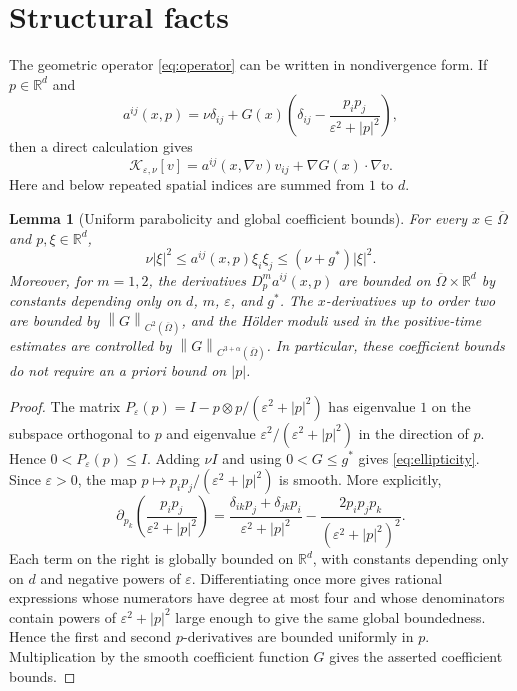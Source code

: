 \documentclass[11pt]{article}
\newtheorem{lemma}[theorem]{Lemma}
\theoremstyle{remark}
\newcommand{\R}{\mathbb{R}}
\newcommand{\eps}{\varepsilon}
\newcommand{\nupar}{\nu}
\newcommand{\norm}[1]{\left\lVert #1\right\rVert}
\newcommand{\cK}{\mathcal{K}}
\begin{document}
\section{Structural facts}
\label{sec:structure}

The geometric operator \eqref{eq:operator} can be written in nondivergence form.  If $p\in\R^d$ and
\begin{equation}\label{eq:aij}
        a^{ij}(x,p)=\nupar\delta_{ij}+G(x)\left(\delta_{ij}-\frac{p_i p_j}{\eps^2+|p|^2}\right),
\end{equation}
then a direct calculation gives
\begin{equation}\label{eq:nondivergence}
        \cK_{\eps,\nupar}[v]
        =a^{ij}(x,\nabla v)v_{ij}+\nabla G(x)\cdot\nabla v.
\end{equation}
Here and below repeated spatial indices are summed from $1$ to $d$.

\begin{lemma}[Uniform parabolicity and global coefficient bounds]\label{lem:ellipticity}
For every $x\in\overline\Omega$ and $p,\xi\in\R^d$,
\begin{equation}\label{eq:ellipticity}
        \nupar |\xi|^2\le a^{ij}(x,p)\xi_i\xi_j\le (\nupar+g^*)|\xi|^2.
\end{equation}
Moreover, for $m=1,2$, the derivatives $D_p^m a^{ij}(x,p)$ are bounded on $\overline\Omega\times\R^d$ by constants depending only on $d$, $m$, $\eps$, and $g^*$.  The $x$-derivatives up to order two are bounded by $\norm{G}_{C^{2}(\overline\Omega)}$, and the H\"older moduli used in the positive-time estimates are controlled by $\norm{G}_{C^{3+\alpha}(\overline\Omega)}$.  In particular, these coefficient bounds do not require an a priori bound on $|p|$.
\end{lemma}

\begin{proof}
The matrix $P_\eps(p)=I-p\otimes p/(\eps^2+|p|^2)$ has eigenvalue $1$ on the subspace orthogonal to $p$ and eigenvalue $\eps^2/(\eps^2+|p|^2)$ in the direction of $p$.  Hence $0<P_\eps(p)\le I$.  Adding $\nupar I$ and using $0<G\le g^*$ gives \eqref{eq:ellipticity}.  Since $\eps>0$, the map $p\mapsto p_i p_j/(\eps^2+|p|^2)$ is smooth.  More explicitly,
\[
        \partial_{p_k}\left(\frac{p_i p_j}{\eps^2+|p|^2}\right)
        =\frac{\delta_{ik}p_j+\delta_{jk}p_i}{\eps^2+|p|^2}
        -\frac{2p_i p_j p_k}{(\eps^2+|p|^2)^2}.
\]
Each term on the right is globally bounded on $\R^d$, with constants depending only on $d$ and negative powers of $\eps$.  Differentiating once more gives rational expressions whose numerators have degree at most four and whose denominators contain powers of $\eps^2+|p|^2$ large enough to give the same global boundedness.  Hence the first and second $p$-derivatives are bounded uniformly in $p$.  Multiplication by the smooth coefficient function $G$ gives the asserted coefficient bounds.
\end{proof}
\end{document}
